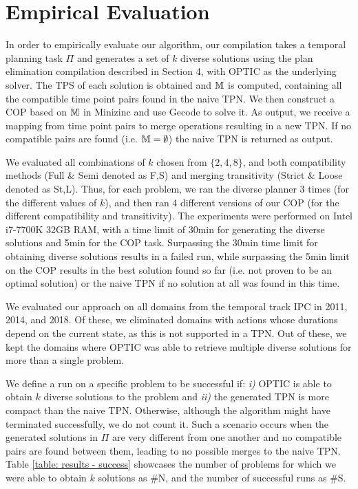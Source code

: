 \section{Empirical Evaluation}
In order to empirically evaluate our algorithm, our compilation takes a temporal planning task $\Pi$ and generates a set of $k$ diverse solutions using the plan elimination compilation described in Section 4, with OPTIC \cite{benton2012temporal} as the underlying solver. The TPS of each solution is obtained and $\mathbb{M}$ is computed, containing all the compatible time point pairs found in the naive TPN.
We then construct a COP based on $\mathbb{M}$ in Minizinc \cite{nethercote2007minizinc} and use Gecode \cite{gecode} to solve it. As output, we receive a mapping from time point pairs to merge operations resulting in a new TPN.
If no compatible pairs are found (i.e. $\mathbb{M} = \emptyset$) the naive TPN is returned as output. 


We evaluated all combinations of $k$ chosen from $\{2,4,8\}$, and both compatibility methods 
(Full \& Semi denoted as F,S) and merging transitivity (Strict \& Loose denoted as St,L). Thus, for each problem, we ran the diverse planner 3 times (for the different values of $k$), and then ran 4 different versions of our COP (for the different compatibility and transitivity). The experiments were performed on Intel i7-7700K 32GB RAM, with a time limit of 30min for generating the diverse solutions and 5min for the COP task.
Surpassing the 30min time limit for obtaining diverse solutions results in a failed run, while surpassing the 5min limit on the COP results in the best solution found so far (i.e. not proven to be an optimal solution) or the naive TPN if no solution at all was found in this time.
 


We evaluated our approach on all domains from the temporal track IPC in 2011, 2014, and 2018. Of these, we eliminated domains with actions whose durations depend on the current state, as this is not supported in a TPN.
Out of these, we kept the domains where OPTIC was able to retrieve multiple diverse solutions for more than a single problem.

We define a run on a specific problem to be successful if: \textit{i)} OPTIC is able to obtain $k$
diverse solutions to the problem and \textit{ii)} the generated TPN is more compact than the naive TPN.
Otherwise, although the algorithm might have terminated successfully, we do not count it.
Such a scenario occurs when the generated solutions in $\Pi$ are very different from one another 
and no compatible pairs are found between them, leading to no possible merges to the naive TPN.
Table \ref{table: results - success} showcases the number of problems for which we were
able to obtain $k$ solutions as \#N, and the number of successful runs as \#S.

